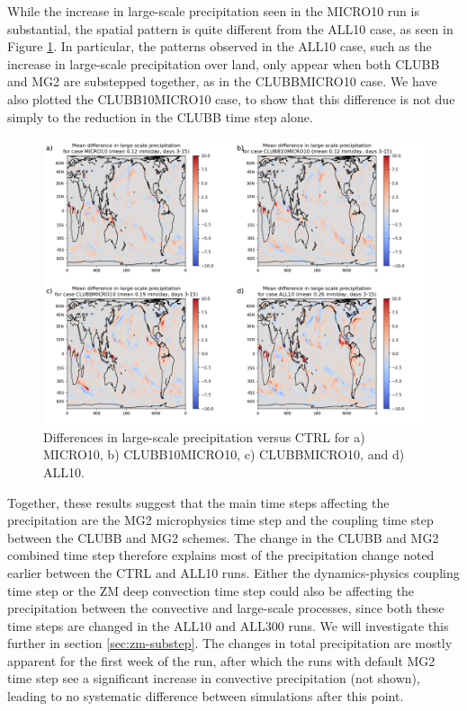 \documentclass [11pt, proquest] {uwthesis}[2020/02/24]
\begin{document}
While the increase in large-scale precipitation seen in the MICRO10 run is substantial, the spatial pattern is quite different from the ALL10 case, as seen in Figure \ref{fig:precl-map}. In particular, the patterns observed in the ALL10 case, such as the increase in large-scale precipitation over land, only appear when both CLUBB and MG2 are substepped together, as in the CLUBBMICRO10 case. We have also plotted the CLUBB10MICRO10 case, to show that this difference is not due simply to the reduction in the CLUBB time step alone.

\begin{figure}
    \centering
    \includegraphics[width=6.5in]{Figure8.png}
    \caption[Differences in large-scale precipitation rates between short EAMv1 runs using different forms of substepping]{Differences in large-scale precipitation versus CTRL for a) MICRO10, b) CLUBB10MICRO10, c) CLUBBMICRO10, and d) ALL10.}
    \label{fig:precl-map}
\end{figure}

Together, these results suggest that the main time steps affecting the precipitation are the MG2 microphysics time step and the coupling time step between the CLUBB and MG2 schemes. The change in the CLUBB and MG2 combined time step therefore explains most of the precipitation change noted earlier between the CTRL and ALL10 runs. Either the dynamics-physics coupling time step or the ZM deep convection time step could also be affecting the precipitation between the convective and large-scale processes, since both these time steps are changed in the ALL10 and ALL300 runs. We will investigate this further in section \ref{sec:zm-substep}. The changes in total precipitation are mostly apparent for the first week of the run, after which the runs with default MG2 time step see a significant increase in convective precipitation (not shown), leading to no systematic difference between simulations after this point.
\end{document}
